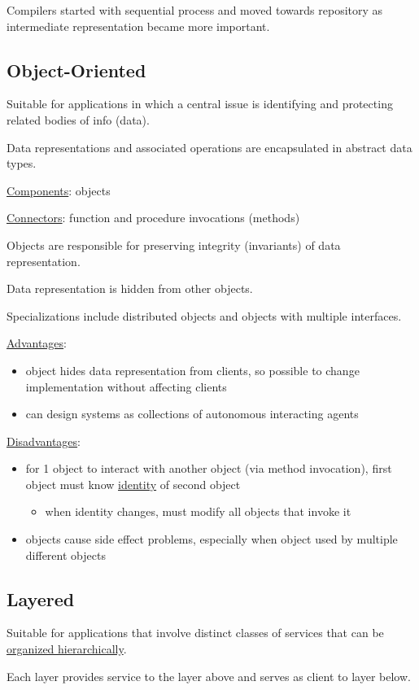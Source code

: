 \documentclass[11pt]{article}
\begin{document}
Compilers started with sequential process and moved towards repository as intermediate
representation became more important.
\subsection{Object-Oriented}
\label{sec:orga86c1dc}
Suitable for applications in which a central issue is identifying and protecting related bodies
of info (data).

Data representations and associated operations are encapsulated in abstract data types.

\uline{Components}: objects

\uline{Connectors}: function and procedure invocations (methods)

Objects are responsible for preserving integrity (invariants) of data representation.

Data representation is hidden from other objects.

Specializations include distributed objects and objects with multiple interfaces.

\uline{Advantages}:
\begin{itemize}
\item object hides data representation from clients, so possible to change implementation without
affecting clients
\item can design systems as collections of autonomous interacting agents
\end{itemize}

\uline{Disadvantages}:
\begin{itemize}
\item for 1 object to interact with another object (via method invocation), first object must know
\uline{identity} of second object
\begin{itemize}
\item when identity changes, must modify all objects that invoke it
\end{itemize}
\item objects cause side effect problems, especially when object used by multiple different objects
\end{itemize}
\subsection{Layered}
\label{sec:orgbc1537d}
Suitable for applications that involve distinct classes of services that can be
\uline{organized hierarchically}.

Each layer provides service to the layer above and serves as client to layer below.
\end{document}
